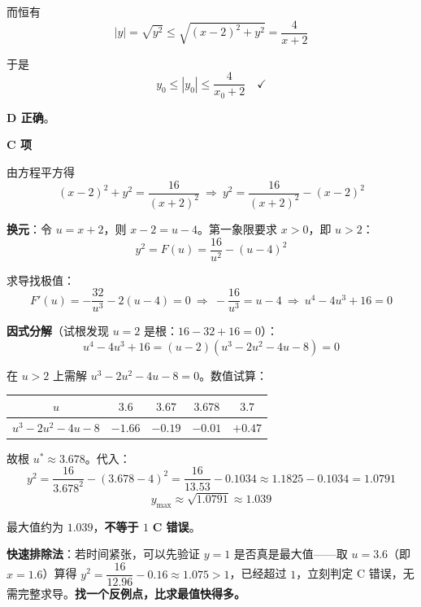 \begin{answer}
而恒有
\nopagebreak[4]
\[|y|=\sqrt{y^{2}}\le\sqrt{(x-2)^{2}+y^{2}}=\frac{4}{x+2}\]

于是
\nopagebreak[4]
\[y_0\le\left|y_0\right|\le\frac{4}{x_0+2}\quad\checkmark\]

 \textbf{D 正确}。

\par\medskip

\textbf{C 项}

由方程平方得
\nopagebreak[4]
\[(x-2)^{2}+y^{2}=\frac{16}{(x+2)^{2}}\ \Longrightarrow\ y^{2}=\frac{16}{(x+2)^{2}}-(x-2)^{2}\]

\textbf{换元}：令 $u=x+2$，则 $x-2=u-4$。第一象限要求 $x>0$，即 $u>2$：
\nopagebreak[4]
\[y^{2}=F(u)=\frac{16}{u^{2}}-(u-4)^{2}\]

求导找极值：
\nopagebreak[4]
\[F'(u)=-\frac{32}{u^{3}}-2(u-4)=0\ \Longrightarrow\ -\frac{16}{u^{3}}=u-4\ \Longrightarrow\ u^{4}-4u^{3}+16=0\]

\textbf{因式分解}（试根发现 $u=2$ 是根：$16-32+16=0$）：
\nopagebreak[4]
\[u^{4}-4u^{3}+16=(u-2)\left(u^{3}-2u^{2}-4u-8\right)=0\]

在 $u>2$ 上需解 $u^{3}-2u^{2}-4u-8=0$。数值试算：

\begin{center}
\begin{tabular}{ccccc}
\toprule
$u$ & $3.6$ & $3.67$ & $3.678$ & $3.7$ \\
\midrule
$u^3-2u^2-4u-8$ & $-1.66$ & $-0.19$ & $-0.01$ & $+0.47$ \\
\bottomrule
\end{tabular}
\end{center}

故根 $u^{*}\approx3.678$。代入：
\nopagebreak[4]
\[y^{2}=\frac{16}{3.678^{2}}-(3.678-4)^{2}=\frac{16}{13.53}-0.1034\approx1.1825-0.1034=1.0791\]
\nopagebreak[4]
\[y_{\max}\approx\sqrt{1.0791}\approx1.039\]

最大值约为 $1.039$，\textbf{不等于 $1$}  \textbf{C 错误}。

\begin{gktip}
\textbf{快速排除法}：若时间紧张，可以先验证 $y=1$ 是否真是最大值——取 $u=3.6$（即 $x=1.6$）算得 $y^2=\dfrac{16}{12.96}-0.16\approx1.075>1$，已经超过 $1$，立刻判定 C 错误，无需完整求导。\textbf{找一个反例点，比求最值快得多。}
\end{gktip}


\par\medskip

\end{answer}

